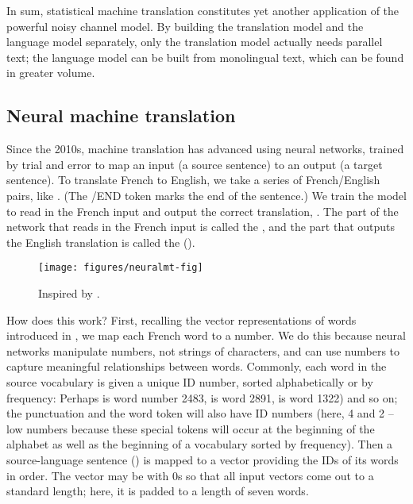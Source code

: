 In sum,  statistical machine translation constitutes yet another application of the powerful noisy channel model. By building the translation model and the language model separately, only the translation model actually needs parallel text; the language model can be built from 
 monolingual text, which can be found in greater volume.

\subsection{Neural machine translation}

Since the 2010s, machine translation has advanced using neural networks, trained by trial and error to map an input (a source sentence) to an output (a target sentence).  To translate French to English, we take a series of French/English pairs, like .  (The /END token marks the end of the sentence.)  We train the model to read in the French input  and output the correct translation, .  The part of the network that reads in the French input is called the , and the part that outputs the English translation is called the  ().


\begin{figure}
\texttt{[image: figures/neuralmt-fig]}
\caption{Inspired by \citet{Alammar:2018}.}
\label{neuralmt}
\end{figure}


How does this work?  First, recalling the vector representations of words introduced in , we map each French word to a number.  We do this because neural networks manipulate numbers, not strings of characters, and can use numbers to capture meaningful relationships between words.   Commonly, each word in the source vocabulary is given a unique ID number, sorted alphabetically or by frequency: Perhaps  is word number 2483,  is word 2891,  is word 1322) and so on; the punctuation and the word  token will also have ID numbers (here, 4 and 2 -- low numbers because these special tokens will occur at the beginning of the alphabet as well as the beginning of a vocabulary sorted by frequency).  Then a source-language sentence () is mapped to a vector providing the IDs of its words in order.  The vector may be  with 0s so that all input vectors come out to a standard length; here, it is padded to a length of seven words. 

